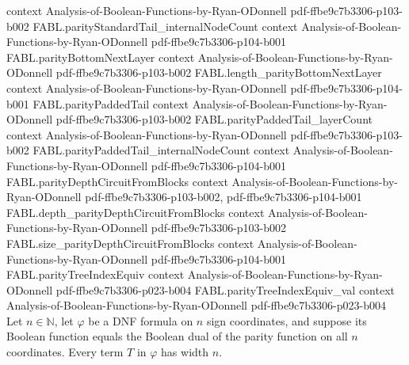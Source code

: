\begin{theorem}
  {context}
  {Analysis-of-Boolean-Functions-by-Ryan-ODonnell}
  {pdf-ffbe9c7b3306-p103-b002}
\proofstep
  {FABL.parityStandardTail_internalNodeCount}
  {context}
  {Analysis-of-Boolean-Functions-by-Ryan-ODonnell}
  {pdf-ffbe9c7b3306-p104-b001}
\proofstep
  {FABL.parityBottomNextLayer}
  {context}
  {Analysis-of-Boolean-Functions-by-Ryan-ODonnell}
  {pdf-ffbe9c7b3306-p103-b002}
\proofstep
  {FABL.length_parityBottomNextLayer}
  {context}
  {Analysis-of-Boolean-Functions-by-Ryan-ODonnell}
  {pdf-ffbe9c7b3306-p104-b001}
\proofstep
  {FABL.parityPaddedTail}
  {context}
  {Analysis-of-Boolean-Functions-by-Ryan-ODonnell}
  {pdf-ffbe9c7b3306-p103-b002}
\proofstep
  {FABL.parityPaddedTail_layerCount}
  {context}
  {Analysis-of-Boolean-Functions-by-Ryan-ODonnell}
  {pdf-ffbe9c7b3306-p103-b002}
\proofstep
  {FABL.parityPaddedTail_internalNodeCount}
  {context}
  {Analysis-of-Boolean-Functions-by-Ryan-ODonnell}
  {pdf-ffbe9c7b3306-p104-b001}
\proofstep
  {FABL.parityDepthCircuitFromBlocks}
  {context}
  {Analysis-of-Boolean-Functions-by-Ryan-ODonnell}
  {pdf-ffbe9c7b3306-p103-b002,
    pdf-ffbe9c7b3306-p104-b001}
\proofstep
  {FABL.depth_parityDepthCircuitFromBlocks}
  {context}
  {Analysis-of-Boolean-Functions-by-Ryan-ODonnell}
  {pdf-ffbe9c7b3306-p103-b002}
\proofstep
  {FABL.size_parityDepthCircuitFromBlocks}
  {context}
  {Analysis-of-Boolean-Functions-by-Ryan-ODonnell}
  {pdf-ffbe9c7b3306-p104-b001}
\proofstep
  {FABL.parityTreeIndexEquiv}
  {context}
  {Analysis-of-Boolean-Functions-by-Ryan-ODonnell}
  {pdf-ffbe9c7b3306-p023-b004}
\proofstep
  {FABL.parityTreeIndexEquiv_val}
  {context}
  {Analysis-of-Boolean-Functions-by-Ryan-ODonnell}
  {pdf-ffbe9c7b3306-p023-b004}
Let $n\in\mathbb{N}$, let $\varphi$ be a DNF formula on $n$ sign coordinates, and
suppose its Boolean function equals the Boolean dual of the parity function on all $n$
coordinates. Every term $T$ in $\varphi$ has width $n$.
\end{theorem}

